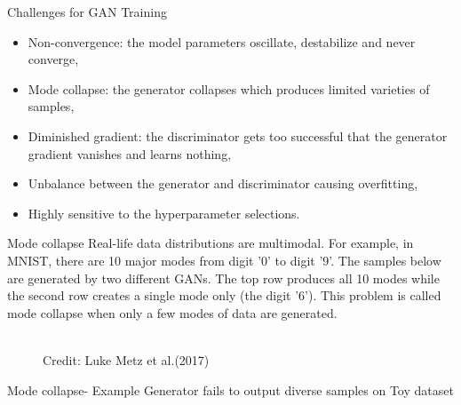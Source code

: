 \begin{frame} {Challenges for GAN Training}

  \begin{itemize}
    \item Non-convergence: the model parameters oscillate, destabilize and never converge,
    \item Mode collapse: the generator collapses which produces limited varieties of samples,
     \item Diminished gradient: the discriminator gets too successful that the generator gradient vanishes and learns nothing,
     \item Unbalance between the generator and discriminator causing overfitting, 
     \item Highly sensitive to the hyperparameter selections.
  \end{itemize}
\end{frame}


\begin{frame} {Mode collapse}
\vspace{2mm}
Real-life data distributions are multimodal. For example, in MNIST, there are 10 major modes from digit '0' to digit '9'. The samples below are generated by two different GANs. The top row produces all 10 modes while the second row creates a single mode only (the digit '6'). This problem is called mode collapse when only a few modes of data are generated. 
\vspace{2mm}
  \begin{figure}
    \centering
      \tiny{\\Credit: Luke Metz et al.(2017)}
  \end{figure}
\end{frame}

\begin{frame} {Mode collapse- Example}
\vspace{2mm}
Generator fails to output diverse samples on Toy dataset
\vspace{2mm}
  \begin{figure}
    \centering
  \end{figure}
\end{frame}


